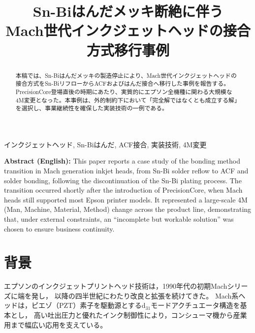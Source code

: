 \documentclass[conference]{IEEEtran}
\begin{document}
\title{Sn-Biはんだメッキ断絶に伴う\\Mach世代インクジェットヘッドの接合方式移行事例}

\author{%
}

\maketitle

\begin{abstract}
本稿では、Sn-Biはんだメッキの製造停止により、Mach世代インクジェットヘッドの接合方式をSn-BiリフローからACFおよびはんだ接合へ移行した事例を報告する。PrecisionCore登場直後の時期にあたり、実質的にエプソン全機種に関わる大規模な4M変更となった。本事例は、外的制約下において「完全解ではなくとも成立する解」を選択し、事業継続性を確保した実装技術の一例である。
\end{abstract}

\begin{IEEEkeywords}
インクジェットヘッド, Sn-Biはんだ, ACF接合, 実装技術, 4M変更
\end{IEEEkeywords}

\vspace{1em}
\noindent
\textbf{Abstract (English):}  
This paper reports a case study of the bonding method transition in Mach generation inkjet heads, from Sn-Bi solder reflow to ACF and solder bonding, following the discontinuation of the Sn-Bi plating process.  
The transition occurred shortly after the introduction of PrecisionCore, when Mach heads still supported most Epson printer models.  
It represented a large-scale 4M (Man, Machine, Material, Method) change across the product line, demonstrating that, under external constraints, an “incomplete but workable solution” was chosen to ensure business continuity.

\section{背景}

エプソンのインクジェットプリントヘッド技術は，1990年代の初期Machシリーズに端を発し，
以降の四半世紀にわたり改良と拡張を続けてきた。  
Mach系ヘッドは，ピエゾ（PZT）素子を駆動源とするd$_{31}$モードアクチュエータ構造を基本とし，
高い吐出圧力と優れたインク制御性により，コンシューマ機から産業用まで幅広い応用を支えている。  
\end{document}
